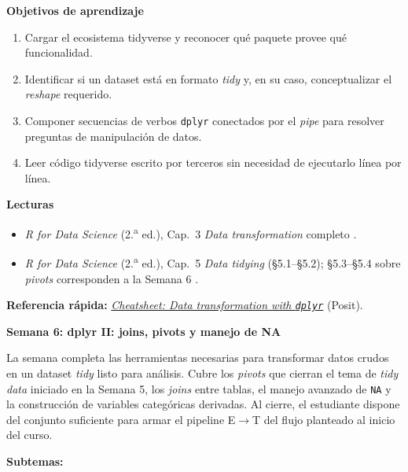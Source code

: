 \documentclass[11pt,letterpaper]{article}
\newcommand{\semana}[2]{%
  \bigskip%
  {\color{main}\Large\bfseries Semana #1: #2\par}%
  \smallskip%
}
\newcommand{\cheatsheet}[2]{%
  \href{https://rstudio.github.io/cheatsheets/#1.pdf}{\textit{Cheatsheet: #2}}%
}
\begin{document}
\medskip
\noindent\textbf{Objetivos de aprendizaje}
\begin{enumerate}[leftmargin=*, itemsep=1pt]
    \item Cargar el ecosistema tidyverse y reconocer qué paquete provee qué funcionalidad.
    \item Identificar si un dataset está en formato \textit{tidy} y, en su caso, conceptualizar el \textit{reshape} requerido.
    \item Componer secuencias de verbos \texttt{dplyr} conectados por el \textit{pipe} para resolver preguntas de manipulación de datos.
    \item Leer código tidyverse escrito por terceros sin necesidad de ejecutarlo línea por línea.
\end{enumerate}

\medskip
\noindent\textbf{Lecturas}
\begin{itemize}[leftmargin=*, itemsep=1pt]
    \item \textit{R for Data Science} (2.\textsuperscript{a} ed.), Cap.\ 3 \textit{Data transformation} completo \cite{wickham2023r4ds}.
    \item \textit{R for Data Science} (2.\textsuperscript{a} ed.), Cap.\ 5 \textit{Data tidying} (§5.1--§5.2); §5.3--§5.4 sobre \textit{pivots} corresponden a la Semana 6 \cite{wickham2023r4ds}.
\end{itemize}

\medskip
\noindent\textbf{Referencia rápida:} \cheatsheet{data-transformation}{Data transformation with \texttt{dplyr}} (Posit).

\semana{6}{dplyr II: joins, pivots y manejo de NA}

La semana completa las herramientas necesarias para transformar datos crudos en un dataset \textit{tidy} listo para análisis. Cubre los \textit{pivots} que cierran el tema de \textit{tidy data} iniciado en la Semana 5, los \textit{joins} entre tablas, el manejo avanzado de \texttt{NA} y la construcción de variables categóricas derivadas. Al cierre, el estudiante dispone del conjunto suficiente para armar el pipeline E$\to$T del flujo planteado al inicio del curso.

\textbf{Subtemas:}
\end{document}
